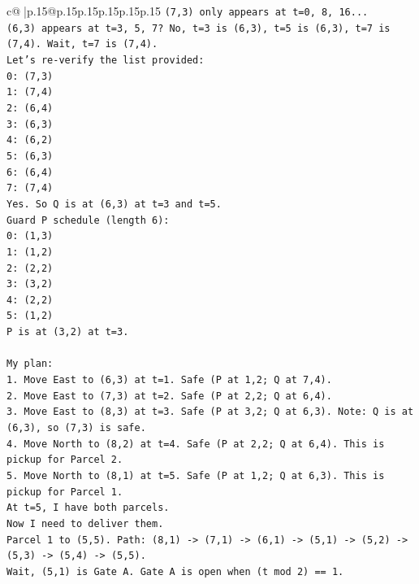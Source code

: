 \documentclass{article}
\begin{document}
{\begin{supertabular}{c@{$\;$}|p{.15\linewidth}@{}p{.15\linewidth}p{.15\linewidth}p{.15\linewidth}p{.15\linewidth}p{.15\linewidth}}
{{{\texttt{(7,3) only appears at t=0, 8, 16...} \\
\texttt{(6,3) appears at t=3, 5, 7? No, t=3 is (6,3), t=5 is (6,3), t=7 is (7,4). Wait, t=7 is (7,4).} \\
\texttt{Let's re{-}verify the list provided:} \\
\texttt{0: (7,3)} \\
\texttt{1: (7,4)} \\
\texttt{2: (6,4)} \\
\texttt{3: (6,3)} \\
\texttt{4: (6,2)} \\
\texttt{5: (6,3)} \\
\texttt{6: (6,4)} \\
\texttt{7: (7,4)} \\
\texttt{Yes. So Q is at (6,3) at t=3 and t=5.} \\
\texttt{Guard P schedule (length 6):} \\
\texttt{0: (1,3)} \\
\texttt{1: (1,2)} \\
\texttt{2: (2,2)} \\
\texttt{3: (3,2)} \\
\texttt{4: (2,2)} \\
\texttt{5: (1,2)} \\
\texttt{P is at (3,2) at t=3.} \\
\\ 
\texttt{My plan:} \\
\texttt{1. Move East to (6,3) at t=1. Safe (P at 1,2; Q at 7,4).} \\
\texttt{2. Move East to (7,3) at t=2. Safe (P at 2,2; Q at 6,4).} \\
\texttt{3. Move East to (8,3) at t=3. Safe (P at 3,2; Q at 6,3). Note: Q is at (6,3), so (7,3) is safe.} \\
\texttt{4. Move North to (8,2) at t=4. Safe (P at 2,2; Q at 6,4). This is pickup for Parcel 2.} \\
\texttt{5. Move North to (8,1) at t=5. Safe (P at 1,2; Q at 6,3). This is pickup for Parcel 1.} \\
\texttt{At t=5, I have both parcels.} \\
\texttt{Now I need to deliver them.} \\
\texttt{Parcel 1 to (5,5). Path: (8,1) {-}> (7,1) {-}> (6,1) {-}> (5,1) {-}> (5,2) {-}> (5,3) {-}> (5,4) {-}> (5,5).} \\
\texttt{Wait, (5,1) is Gate A. Gate A is open when (t mod 2) == 1.} \\
}}}
\end{supertabular}}
\end{document}
